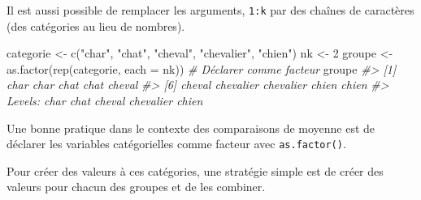 \documentclass[
]{book}
\newenvironment{Shaded}{}{}
\newcommand{\AttributeTok}[1]{#1}
\newcommand{\CommentTok}[1]{\textit{#1}}
\newcommand{\DecValTok}[1]{#1}
\newcommand{\FunctionTok}[1]{#1}
\newcommand{\NormalTok}[1]{#1}
\newcommand{\OtherTok}[1]{#1}
\newcommand{\StringTok}[1]{#1}
\begin{document}
Il est aussi possible de remplacer les arguments, \texttt{1:k} par des chaînes de caractères (des catégories au lieu de nombres).

\begin{Shaded}
\begin{Highlighting}[]
\NormalTok{categorie }\OtherTok{\textless{}{-}} \FunctionTok{c}\NormalTok{(}\StringTok{"char"}\NormalTok{, }\StringTok{"chat"}\NormalTok{, }\StringTok{"cheval"}\NormalTok{, }\StringTok{"chevalier"}\NormalTok{, }\StringTok{"chien"}\NormalTok{)}
\NormalTok{nk }\OtherTok{\textless{}{-}} \DecValTok{2}
\NormalTok{groupe }\OtherTok{\textless{}{-}} \FunctionTok{as.factor}\NormalTok{(}\FunctionTok{rep}\NormalTok{(categorie, }\AttributeTok{each =}\NormalTok{ nk)) }\CommentTok{\# Déclarer comme facteur}
\NormalTok{groupe}
\CommentTok{\#\textgreater{}  [1] char      char      chat      chat      cheval   }
\CommentTok{\#\textgreater{}  [6] cheval    chevalier chevalier chien     chien    }
\CommentTok{\#\textgreater{} Levels: char chat cheval chevalier chien}
\end{Highlighting}
\end{Shaded}

Une bonne pratique dans le contexte des comparaisons de moyenne est de déclarer les variables catégorielles comme facteur avec \texttt{as.factor()}.

Pour créer des valeurs à ces catégories, une stratégie simple est de créer des valeurs pour chacun des groupes et de les combiner.
\end{document}
